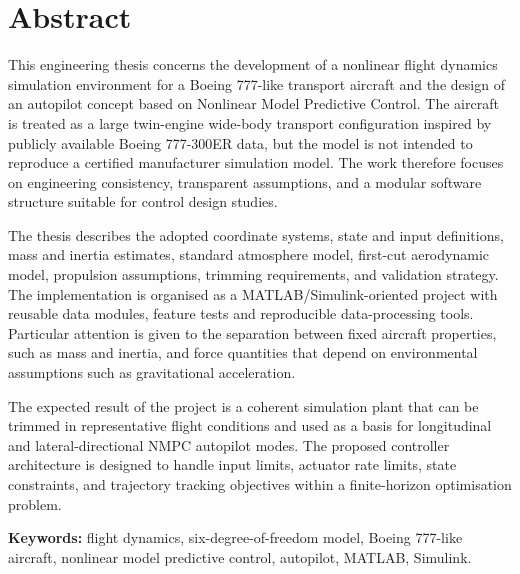 \chapter*{Abstract}

This engineering thesis concerns the development of a nonlinear flight dynamics simulation environment for a Boeing 777-like transport aircraft and the design of an autopilot concept based on Nonlinear Model Predictive Control. The aircraft is treated as a large twin-engine wide-body transport configuration inspired by publicly available Boeing 777-300ER data, but the model is not intended to reproduce a certified manufacturer simulation model. The work therefore focuses on engineering consistency, transparent assumptions, and a modular software structure suitable for control design studies.

The thesis describes the adopted coordinate systems, state and input definitions, mass and inertia estimates, standard atmosphere model, first-cut aerodynamic model, propulsion assumptions, trimming requirements, and validation strategy. The implementation is organised as a MATLAB/Simulink-oriented project with reusable data modules, feature tests and reproducible data-processing tools. Particular attention is given to the separation between fixed aircraft properties, such as mass and inertia, and force quantities that depend on environmental assumptions such as gravitational acceleration.

The expected result of the project is a coherent simulation plant that can be trimmed in representative flight conditions and used as a basis for longitudinal and lateral-directional NMPC autopilot modes. The proposed controller architecture is designed to handle input limits, actuator rate limits, state constraints, and trajectory tracking objectives within a finite-horizon optimisation problem.

\textbf{Keywords:} flight dynamics, six-degree-of-freedom model, Boeing 777-like aircraft, nonlinear model predictive control, autopilot, MATLAB, Simulink.
